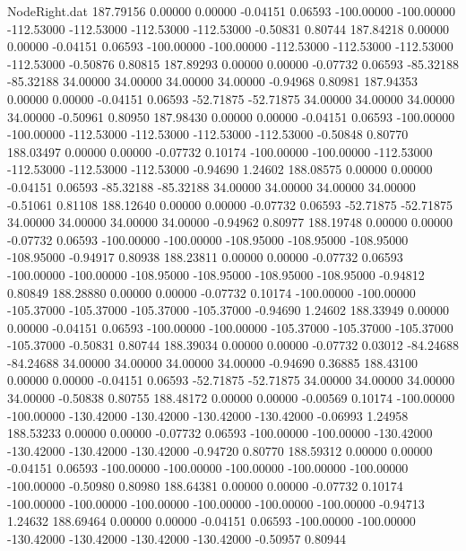 \begin{filecontents}{NodeRight.dat}
 187.79156    0.00000    0.00000    -0.04151    0.06593 -100.00000 -100.00000 -112.53000 -112.53000 -112.53000 -112.53000   -0.50831    0.80744
 187.84218    0.00000    0.00000    -0.04151    0.06593 -100.00000 -100.00000 -112.53000 -112.53000 -112.53000 -112.53000   -0.50876    0.80815
 187.89293    0.00000    0.00000    -0.07732    0.06593  -85.32188  -85.32188   34.00000   34.00000   34.00000   34.00000   -0.94968    0.80981
 187.94353    0.00000    0.00000    -0.04151    0.06593  -52.71875  -52.71875   34.00000   34.00000   34.00000   34.00000   -0.50961    0.80950
 187.98430    0.00000    0.00000    -0.04151    0.06593 -100.00000 -100.00000 -112.53000 -112.53000 -112.53000 -112.53000   -0.50848    0.80770
 188.03497    0.00000    0.00000    -0.07732    0.10174 -100.00000 -100.00000 -112.53000 -112.53000 -112.53000 -112.53000   -0.94690    1.24602
 188.08575    0.00000    0.00000    -0.04151    0.06593  -85.32188  -85.32188   34.00000   34.00000   34.00000   34.00000   -0.51061    0.81108
 188.12640    0.00000    0.00000    -0.07732    0.06593  -52.71875  -52.71875   34.00000   34.00000   34.00000   34.00000   -0.94962    0.80977
 188.19748    0.00000    0.00000    -0.07732    0.06593 -100.00000 -100.00000 -108.95000 -108.95000 -108.95000 -108.95000   -0.94917    0.80938
 188.23811    0.00000    0.00000    -0.07732    0.06593 -100.00000 -100.00000 -108.95000 -108.95000 -108.95000 -108.95000   -0.94812    0.80849
 188.28880    0.00000    0.00000    -0.07732    0.10174 -100.00000 -100.00000 -105.37000 -105.37000 -105.37000 -105.37000   -0.94690    1.24602
 188.33949    0.00000    0.00000    -0.04151    0.06593 -100.00000 -100.00000 -105.37000 -105.37000 -105.37000 -105.37000   -0.50831    0.80744
 188.39034    0.00000    0.00000    -0.07732    0.03012  -84.24688  -84.24688   34.00000   34.00000   34.00000   34.00000   -0.94690    0.36885
 188.43100    0.00000    0.00000    -0.04151    0.06593  -52.71875  -52.71875   34.00000   34.00000   34.00000   34.00000   -0.50838    0.80755
 188.48172    0.00000    0.00000    -0.00569    0.10174 -100.00000 -100.00000 -130.42000 -130.42000 -130.42000 -130.42000   -0.06993    1.24958
 188.53233    0.00000    0.00000    -0.07732    0.06593 -100.00000 -100.00000 -130.42000 -130.42000 -130.42000 -130.42000   -0.94720    0.80770
 188.59312    0.00000    0.00000    -0.04151    0.06593 -100.00000 -100.00000 -100.00000 -100.00000 -100.00000 -100.00000   -0.50980    0.80980
 188.64381    0.00000    0.00000    -0.07732    0.10174 -100.00000 -100.00000 -100.00000 -100.00000 -100.00000 -100.00000   -0.94713    1.24632
 188.69464    0.00000    0.00000    -0.04151    0.06593 -100.00000 -100.00000 -130.42000 -130.42000 -130.42000 -130.42000   -0.50957    0.80944

\end{filecontents}
